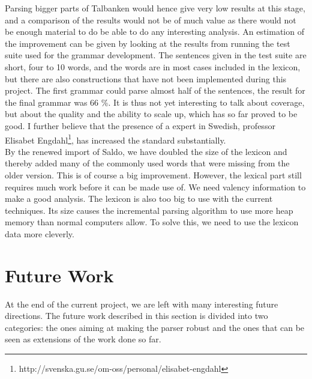 \documentclass{report}
\begin{document}
Parsing bigger parts of Talbanken would hence give very low results at this stage, 
and a comparison of the results would not be of much value as
there would not be enough material %
to do be able to do any interesting analysis.
An estimation of the improvement can be given by looking at the results from
running the test suite used for the grammar development.
The sentences given in the test suite are short, four to 10 words, and the
words are in most cases included in
the lexicon, but there are also constructions that have not been implemented 
during this project.
The first grammar could parse almost half of the sentences, the result for the final
grammar was 66 \%. 
It is thus not yet interesting to talk about coverage, but about the quality and
the ability to scale up, which has so far proved to be good.
I further believe that the presence of a expert in Swedish, professor Elisabet
Engdahl\footnote{http://svenska.gu.se/om-oss/personal/elisabet-engdahl},
has
increased the standard substantially.\\


By the renewed import of Saldo, we have doubled the size of the lexicon and thereby
added many of the commonly used words that were missing from the older
version. This is of course a big improvement.
However, the lexical part still requires much work before it can be made use of.
We need valency information to make a good analysis. The lexicon is also too
big to use with the current techniques. Its size causes the
incremental parsing algorithm to use more heap memory than normal computers
allow. To solve this, we need to use the lexicon data more cleverly.

%
%

\section{Future Work}
\label{sec:future}
At the end of the current project,
we are left with 
many interesting future directions.
The future work described in this section is divided into two categories:
the ones aiming at making the parser robust and the ones that can be
seen as extensions of the work done so far.
 
\end{document}
